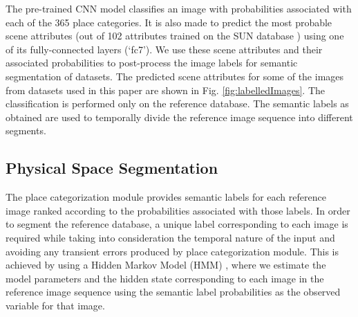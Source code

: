 \documentclass[letterpaper, 10 pt, conference]{ieeeconf}  %
\begin{document}
The pre-trained CNN model classifies an image with probabilities associated with each of the 365 place categories. It is also made to predict the most probable scene attributes (out of 102 attributes trained on the SUN database \cite{Patterson2012SunAttributes}) using one of its fully-connected layers (`fc7'). We use these scene attributes and their associated probabilities to post-process the image labels for semantic segmentation of datasets. The predicted scene attributes for some of the images from datasets used in this paper are shown in Fig. \ref{fig:labelledImages}. The classification is performed only on the reference database. The semantic labels as obtained are used to temporally divide the reference image sequence into different segments.

\subsection{Physical Space Segmentation}
The place categorization module provides semantic labels for each reference image ranked according to the probabilities associated with those labels. In order to segment the reference database, a unique label corresponding to each image is required while taking into consideration the temporal nature of the input and avoiding any transient errors produced by place categorization module. This is achieved by using a Hidden Markov Model (HMM) \cite{honkela2001nonlinear,hmmlearn}, where we estimate the model parameters and the hidden state corresponding to each image in the reference image sequence using the semantic label probabilities as the observed variable for that image.
\end{document}

